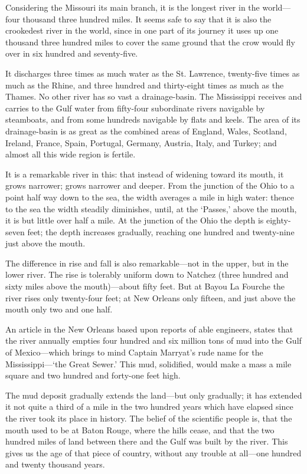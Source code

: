 \documentclass[../../../demo.tex]{novelettesubdoc}
\begin{document}

Considering the Missouri its main branch, it is the longest river in the
world---four thousand three hundred miles. It seems safe to say that it is
also the crookedest river in the world, since in one part of its journey
it uses up one thousand three hundred miles to cover the same ground that the
crow would fly over in six hundred and seventy-five.

It discharges three times as much water as the St. Lawrence, twenty-five times
as much as the Rhine, and three hundred and thirty-eight times as much as the
Thames. No other river has so vast a drainage-basin. The
Mississippi receives\edit{}{,} and carries to the Gulf\edit{}{,} water from
fifty-four subordinate rivers navigable by steamboats,
and from some hundreds navigable by flats and keels.
The area of its drainage-basin is as great as the combined areas of England,
Wales, Scotland, Ireland, France, Spain, Portugal, Germany, Austria, Italy,
and Turkey; and almost all this wide region is fertile.

It is a remarkable river in this: that instead of widening toward its
mouth, it grows narrower; grows narrower and deeper. From the junction
of the Ohio to a point half way down to the sea, the width averages a
mile in high water: thence to the sea the width steadily diminishes,
until, at the `Passes,' above the mouth, it is but little over half
a mile. At the junction of the Ohio the  depth is
eighty-seven feet; the depth increases gradually, reaching one hundred
and twenty-nine just above the mouth.

The difference in rise and fall is also remarkable---not in the upper,
but in the lower river. The rise is tolerably uniform down to Natchez
(three hundred and sixty miles above the mouth)---about fifty feet.
But at Bayou La Fourche the river rises only twenty-four feet; at New
Orleans only fifteen, and just above the mouth only two and one half.

An article in the New Orleans   based upon reports of
able engineers, states that the river annually empties four hundred and
six million tons of mud into the Gulf of Mexico---which brings to mind
Captain Marryat's rude name for the Mississippi---`the Great Sewer.' This
mud, solidified, would make a mass a mile square and two hundred and
forty-one feet high.

The mud deposit gradually extends the land---but only gradually; it has
extended it not quite a third of a mile in the two hundred years which
have elapsed since the river took its place in history. The belief of
the scientific people is, that the mouth used to be at Baton Rouge,
where the hills cease, and that the two hundred miles of land between
there and the Gulf was built by the river. This gives us the age of that
piece of country, without any trouble at all---one hundred and twenty
thousand years.
\end{document}
